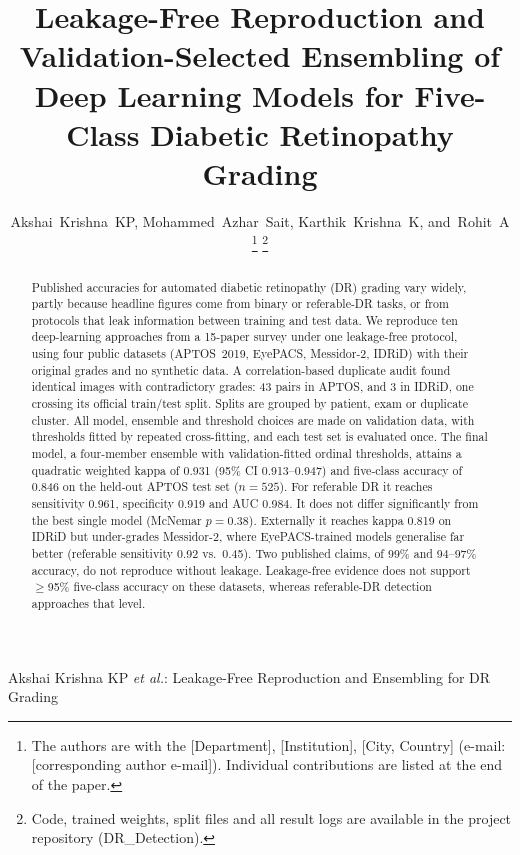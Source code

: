 \documentclass[journal]{IEEEtran}
\begin{document}
\title{Leakage-Free Reproduction and Validation-Selected Ensembling of Deep Learning Models for
Five-Class Diabetic Retinopathy Grading}

\author{Akshai~Krishna~KP,
Mohammed~Azhar~Sait,
Karthik~Krishna~K,
and~Rohit~A%
\thanks{The authors are with the [Department], [Institution], [City, Country]
(e-mail: [corresponding author e-mail]). Individual contributions are listed at the end of the
paper.}%
\thanks{Code, trained weights, split files and all result logs are available in the project
repository (DR\_Detection).}}

%
{Akshai Krishna KP \MakeLowercase{\textit{et al.}}: Leakage-Free Reproduction and Ensembling for DR Grading}

\maketitle

\begin{abstract}
Published accuracies for automated diabetic retinopathy (DR) grading vary widely, partly because
headline figures come from binary or referable-DR tasks, or from protocols that leak information
between training and test data. We reproduce ten deep-learning approaches from a 15-paper survey under
one leakage-free protocol, using four public datasets (APTOS~2019, EyePACS, Messidor-2, IDRiD) with
their original grades and no synthetic data. A correlation-based duplicate audit found identical images
with contradictory grades: 43 pairs in APTOS, and 3 in IDRiD, one crossing its official train/test
split. Splits are grouped by patient, exam or duplicate cluster. All model, ensemble and threshold
choices are made on validation data, with thresholds fitted by repeated cross-fitting, and each test
set is evaluated once. The final model, a four-member ensemble with validation-fitted ordinal
thresholds, attains a quadratic weighted kappa of 0.931 (95\% CI 0.913--0.947) and five-class accuracy
of 0.846 on the held-out APTOS test set ($n=525$). For referable DR it reaches sensitivity 0.961,
specificity 0.919 and AUC 0.984. It does not differ significantly from the best single model (McNemar
$p=0.38$). Externally it reaches kappa 0.819 on IDRiD but under-grades Messidor-2, where
EyePACS-trained models generalise far better (referable sensitivity 0.92 vs.\ 0.45). Two published
claims, of 99\% and 94--97\% accuracy, do not reproduce without leakage. Leakage-free evidence does not
support $\geq$95\% five-class accuracy on these datasets, whereas referable-DR detection approaches
that level.
\end{abstract}
\end{document}
